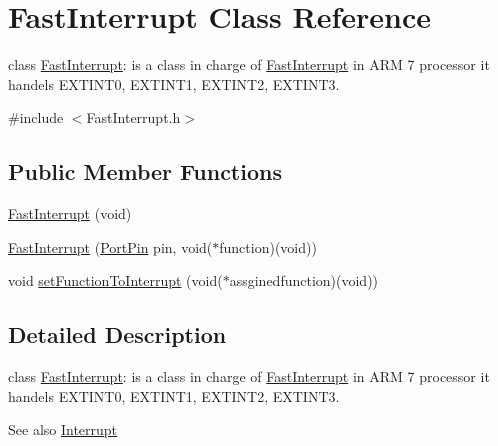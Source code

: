 \hypertarget{class_fast_interrupt}{
\section{FastInterrupt Class Reference}
\label{db/d0c/class_fast_interrupt}
}


class \hyperlink{class_fast_interrupt}{FastInterrupt}: is a class in charge of \hyperlink{class_fast_interrupt}{FastInterrupt} in ARM 7 processor it handels EXTINT0, EXTINT1, EXTINT2, EXTINT3.  




{\ttfamily \#include $<$FastInterrupt.h$>$}

\subsection*{Public Member Functions}
\begin{DoxyCompactItemize}
\item 
\hyperlink{class_fast_interrupt_a71047e74a5999eef5e462ac48cea7ab7}{FastInterrupt} (void)
\item 
\hyperlink{group__group11_ga1cd10c91ae081005e8cd4663ff33f230}{FastInterrupt} (\hyperlink{class_port_pin}{PortPin} pin, void($\ast$function)(void))
\item 
void \hyperlink{group__group11_gab84661ddc77f64481ee9d389aa01ea46}{setFunctionToInterrupt} (void($\ast$assginedfunction)(void))
\end{DoxyCompactItemize}


\subsection{Detailed Description}
class \hyperlink{class_fast_interrupt}{FastInterrupt}: is a class in charge of \hyperlink{class_fast_interrupt}{FastInterrupt} in ARM 7 processor it handels EXTINT0, EXTINT1, EXTINT2, EXTINT3. 

\begin{DoxySeeAlso}{See also}
\hyperlink{class_interrupt}{Interrupt} 
\end{DoxySeeAlso}



